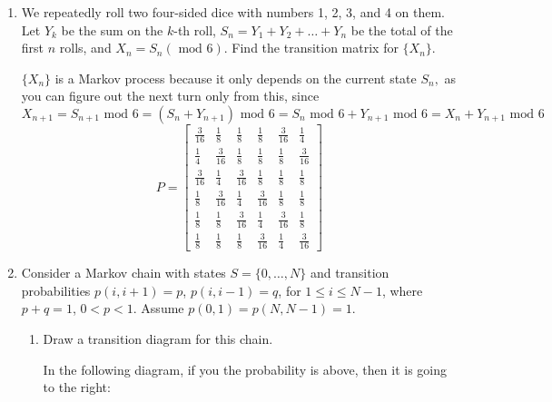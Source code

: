 \documentclass[10pt, oneside]{article}
\theoremstyle{definition}
\begin{document}
\begin{enumerate}
    \item We repeatedly roll two four-sided dice with numbers 1, 2, 3, and 4 on them. Let $Y_k$ be the sum on the $k$-th roll, $S_n = Y_1 + Y_2 + \dots + Y_n$ be the total of the first $n$ rolls, and $X_n = S_n (\text{ mod } 6)$. Find the transition matrix for $\{X_n\}$.
    \begin{solution}
        $\{X_n\}$ is a Markov process because it only depends on the current state $S_n,$ as you can figure out the next turn only from this, since 
        \[X_{n + 1} = S_{n + 1}\text{ mod } 6 = (S_{n} + Y_{n + 1})\text{ mod } 6= S_n \text{ mod } 6 + Y_{n + 1}\text{ mod } 6 = X_n + Y_{n+1}\text{ mod } 6\] 
        \[P = \begin{bmatrix}
            \frac{3}{16} & \frac{1}{8} & \frac{1}{8} & \frac{1}{8} & \frac{3}{16} & \frac{1}{4}\\
             \frac{1}{4} & \frac{3}{16}& \frac{1}{8} & \frac{1}{8} & \frac{1}{8} & \frac{3}{16} \\
             \frac{3}{16} & \frac{1}{4} & \frac{3}{16}& \frac{1}{8} & \frac{1}{8} & \frac{1}{8} \\
             \frac{1}{8} & \frac{3}{16} & \frac{1}{4} & \frac{3}{16}& \frac{1}{8} & \frac{1}{8} \\
             \frac{1}{8} &\frac{1}{8} & \frac{3}{16} & \frac{1}{4} & \frac{3}{16}& \frac{1}{8} \\
             \frac{1}{8} &\frac{1}{8} &\frac{1}{8} & \frac{3}{16} & \frac{1}{4} & \frac{3}{16} 
        \end{bmatrix}\]
    \end{solution}

    \item Consider a Markov chain with states $S = \{0, \dots, N\}$ and transition probabilities $p(i, i+1) = p$, $p(i, i-1) = q$, for $1 \leq i \leq N-1$, where $p+q = 1$, $0 < p < 1$. Assume $p(0,1) = p(N, N-1) = 1$.
    \begin{enumerate}
        \item Draw a transition diagram for this chain.
        \begin{solution}
        In the following diagram, if you the probability  is above, then it is going to the right:
            \begin{center}
\end{center}
\end{solution}
\end{enumerate}
\end{enumerate}
\end{document}
